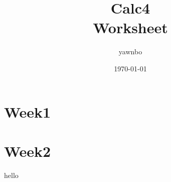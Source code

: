 \documentclass{report}
\title{\Huge{Calc4}\\ Worksheet }
\author{\huge{yawnbo}}
\date{\today}
\begin{document}
\maketitle
\tableofcontents
\pagebreak

\chapter{Week1}


\chapter{Week2}

hello
\end{document}
